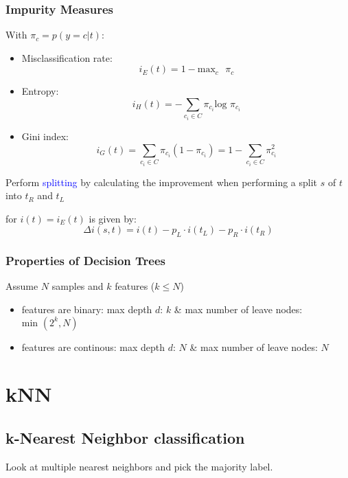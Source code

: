 \documentclass[a4paper,10pt,twoside=true,DIV=10,headsepline,plainheadsepline]{scrartcl}
\begin{document}
		\subsubsection{Impurity Measures}
			With $\pi_c = p(y = c | t)$:
			\begin{itemize}
 				\item Misclassification rate:
				\begin{equation}
					i_E (t) = 1 - \textrm{max}_c \textrm{ }\pi_c
				\end{equation}
				\item Entropy:
				\begin{equation}
					i_H (t) = - \sum_{c_i \in C} \pi_{c_i} \textrm{log } \pi_{c_i}
				\end{equation}
				\item Gini index:
				\begin{equation}
					i_G (t) = \sum_{c_i \in C} \pi_{c_i} (1 - \pi_{c_i}) = 1 - \sum_{c_i \in C} \pi_{c_i}^2
				\end{equation}
			\end{itemize}

		Perform \textcolor{blue}{splitting} by calculating the improvement when performing a split $s$ of $t$ into $t_R$ and $t_L$ 


for $i(t) = i_E (t)$ is given by:
		\begin{equation}
			\Delta i (s,t) = i(t) - p_L \cdot i(t_L) - p_R \cdot i(t_R)
		\end{equation}

		\subsubsection{Properties of Decision Trees}
		Assume $N$ samples and $k$ features ($k \leq N$)
		\begin{itemize}
 			\item features are binary: max depth $d$: $k$ \& max number of leave nodes: $\text{min } (2^k, N)$
			\item features are continous: max depth $d$: $N$ \& max number of leave nodes: $N$
		\end{itemize}
			
	\section{kNN}
	\subsection{k-Nearest Neighbor classification}
	Look at multiple nearest neighbors and pick the majority label. 
\end{document}
